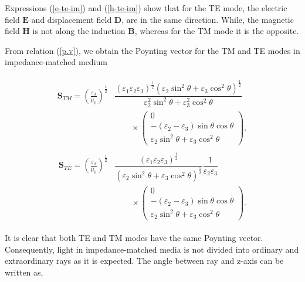 \documentclass[9pt,twocolumn,twoside]{osajnl}
\begin{document}
Expressions (\ref{e-te-im}) and (\ref{h-te-im}) show that for the TE mode, the electric field $\mathbf{E}$ and displacement field $\mathbf{D}$, are in the same direction. While, the magnetic field $\mathbf{H}$ is not along the induction $\mathbf{B}$, whereas for the  TM mode it is the opposite.


From relation (\ref{p.v}), we obtain the Poynting vector for the TM and TE modes in impedance-matched medium

\begin{align}\label{s}
\begin{split}
  \mathbf{S}_{TM}=\left(\frac{\varepsilon_{0}}{\mu_{0}}\right)^{\frac{1}{2}}&\dfrac{(\varepsilon_{1}\varepsilon_{2}\varepsilon_{3})^{\frac{1}{2}}({\varepsilon_{2}\sin^{2}{\theta}+\varepsilon_{3}\cos^{2}{\theta}})^{\frac{1}{2}}}{\varepsilon_{2}^{2} \sin^{2}{\theta} + \varepsilon_{3}^{2}\cos^{2}{\theta}}
\\& \qquad\times
 \begin{pmatrix}
 0\\ -(\varepsilon_{2}-\varepsilon_{3})\sin{\theta}\cos{\theta}  \\  \varepsilon_{2} \sin^{2}{\theta} + \varepsilon_{3}\cos^{2}{\theta}
 \end{pmatrix},
 \end{split}
 \end{align}
\begin{align}\label{p.v 2}
\begin{split}
\mathbf{S}_{TE}=\left(\frac{\varepsilon_{0}}{\mu_{0}}\right)^{\frac{1}{2}}&\dfrac{(\varepsilon_{1}\varepsilon_{2}\varepsilon_{3})^{\frac{1}{2}}}{({\varepsilon_{2}\sin^{2}{\theta}+\varepsilon_{3}\cos^{2}{\theta}})^{\frac{1}{2}}}\dfrac{1}{\varepsilon_{2}\varepsilon_{3}}
\\ &\qquad\times
\begin{pmatrix}
 0 \\ -(\varepsilon_{2}-\varepsilon_{3})\sin\theta\cos\theta \\   \varepsilon_{2} \sin^{2}\theta + \varepsilon_{3}\cos^{2}\theta
 \end{pmatrix}.
 \end{split}
\end{align}

It is clear that both TE and TM modes have the same Poynting vector. Consequently, light in impedance-matched media is not divided into ordinary and extraordinary rays as it is expected.
The angle between ray and z-axis can be written as,
\end{document}
